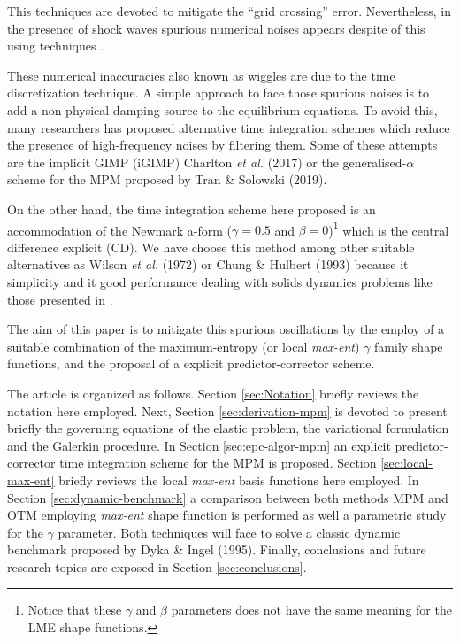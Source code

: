This techniques are devoted to mitigate the
``grid crossing'' error. Nevertheless, in the presence of shock waves spurious
numerical noises appears despite of this using techniques
\cite{Tran2019e}.

These numerical inaccuracies also known as wiggles
are due to the time discretization technique. A simple approach to
face those spurious noises is to add a non-physical damping source to the
equilibrium equations. To avoid this, many researchers
has proposed alternative time integration schemes which reduce the
presence of high-frequency noises by filtering them. Some of these
attempts are the implicit GIMP (iGIMP) Charlton {\it et al.}
(2017)\nocite{Charlton2017} or the generalised-$\alpha$ scheme for the
MPM proposed by Tran \& Solowski (2019)\nocite{Tran2019e}.

On the other hand, the time integration scheme here proposed is an accommodation of
the Newmark a-form ($\gamma = 0.5$ and $\beta = 0$)\footnote{Notice
that these $\gamma$ and $\beta$ parameters does not have the same
meaning for the LME shape functions.} which is the central difference
explicit (CD). We have choose this method among other suitable
alternatives as Wilson {\it et al.} (1972)\nocite{Wilson1972} or Chung
\& Hulbert (1993)\nocite{Geranlized_alpha_1993} because it simplicity
and it good performance dealing with solids dynamics problems like those
presented in \cite{Navas2018a}.


The aim of this paper is to mitigate this spurious oscillations by the
employ of a suitable combination of the maximum-entropy (or local
\textit{max-ent}) $\gamma$ family shape functions, and the proposal of a explicit 
predictor-corrector scheme.


The article is organized as follows. Section \ref{sec:Notation}
briefly reviews the notation here employed. Next, Section \ref{sec:derivation-mpm}
is devoted to present briefly the governing equations of the elastic
problem, the variational formulation and the Galerkin procedure. In Section \ref{sec:epc-algor-mpm} an explicit predictor-corrector
time integration scheme for the MPM is proposed. Section
\ref{sec:local-max-ent} briefly reviews the local \textit{max-ent}
basis functions here employed. In Section \ref{sec:dynamic-benchmark}
a comparison between both methods MPM and OTM employing \textit{max-ent} shape
function is performed as well a parametric study for the $\gamma$
parameter. Both techniques will face to solve a classic dynamic
benchmark proposed by Dyka \& Ingel (1995)\cite{Dyka1995}. Finally,
conclusions and future research topics are exposed in Section \ref{sec:conclusions}.

